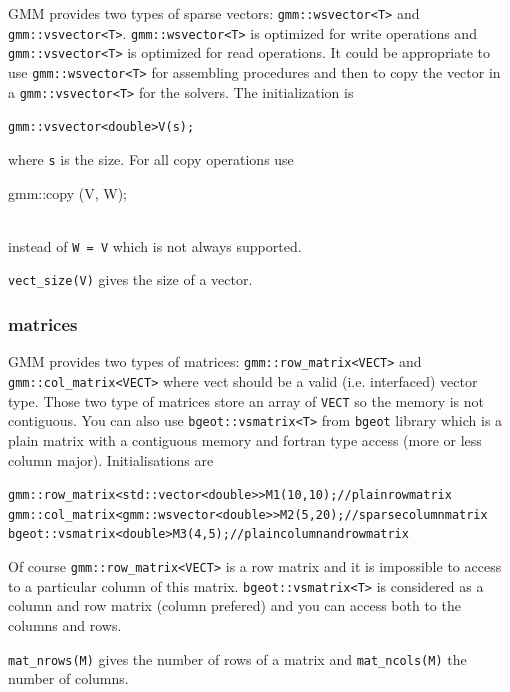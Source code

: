 \documentclass[11pt,a4paper]{article}
\begin{document}
GMM provides two types of sparse vectors: {\tt gmm::wsvector<T>} and {\tt gmm::vsvector<T>}. {\tt gmm::wsvector<T>} is optimized for write operations and {\tt gmm::vsvector<T>} is optimized for read operations. It could be appropriate to use {\tt gmm::wsvector<T>} for assembling procedures and then to copy the vector in a {\tt gmm::vsvector<T>} for the solvers. The initialization is
\begin{alltt}
  gmm::vsvector<double> V(s);
\end{alltt}
where {\tt s} is the size. For all copy operations use\\[0.2cm]
\begin{tt}
  gmm::copy (V, W);
\end{tt}\\[0.2cm]
instead of {\tt W = V} which is not always supported.

{\tt vect_size(V)} gives the size of a vector.

\subsubsection{matrices}

GMM provides two types of matrices: {\tt gmm::row_matrix<VECT>} and {\tt gmm::col_matrix<VECT>} where vect should be a valid (i.e. interfaced) vector type.
Those two type of matrices store an array of {\tt VECT} so the memory is not contiguous. You can also use {\tt bgeot::vsmatrix<T>} from {\tt bgeot} library which is a plain matrix with a contiguous memory and fortran type access (more or less column major). Initialisations are
\begin{alltt}
  gmm::row_matrix< std::vector<double> > M1(10, 10);  // plain row matrix
  gmm::col_matrix< gmm::wsvector<double> > M2(5, 20); // sparse column matrix
  bgeot::vsmatrix<double> M3(4, 5); // plain column and row matrix
\end{alltt}
Of course {\tt gmm::row_matrix<VECT>} is a row matrix and it is impossible to access to a particular column of this matrix. {\tt bgeot::vsmatrix<T>} is considered as a column and row matrix (column prefered) and you can access both to the columns and rows.

{\tt mat_nrows(M)} gives the number of rows of a matrix and {\tt mat_ncols(M)} the number of columns.
\end{document}
